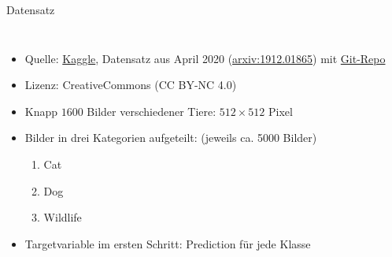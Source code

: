 \documentclass[aspectratio=1610, 9pt]{beamer}
\begin{document}
\begin{frame}{Datensatz}
  \begin{columns}


    \begin{itemize}
    \item Quelle: \href{https://www.kaggle.com/andrewmvd/animal-faces?}{Kaggle}, Datensatz aus April 2020 (\href{https://arxiv.org/abs/1912.01865}{arxiv:1912.01865}) mit \href{https://github.com/clovaai/stargan-v2}{Git-Repo}
    \item Lizenz: CreativeCommons (CC BY-NC 4.0)
    \item Knapp $1600$ Bilder verschiedener Tiere: $512\times 512$ Pixel
    \item Bilder in drei Kategorien aufgeteilt: (jeweils ca. 5000 Bilder)
      \begin{enumerate}
      \item Cat
      \item Dog
      \item Wildlife
      \end{enumerate}
    \item Targetvariable im ersten Schritt: Prediction für jede Klasse
    \end{itemize}


\end{columns}
\end{frame}
\end{document}

